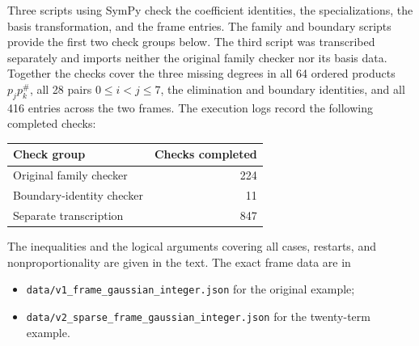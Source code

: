 Three scripts using SymPy check the coefficient identities, the
specializations, the basis transformation, and the frame entries.
The family and boundary scripts provide the first two check groups below.
The third script was transcribed separately and imports neither the original
family checker nor its basis data. Together the checks cover the three missing
degrees in all 64 ordered products $p_jp_k^\#$, all 28 pairs $0\le i<j\le7$,
the elimination and boundary identities, and all 416 entries across the
two frames. The execution logs record the following completed checks:
\begin{center}
\begin{tabular}{lr}
\toprule
Check group & Checks completed\\
\midrule
Original family checker &224\\
Boundary-identity checker &11\\
Separate transcription &847\\
\bottomrule
\end{tabular}
\end{center}
The inequalities and the logical arguments covering all cases, restarts,
and nonproportionality are given in the text. The exact frame data are in
\begin{itemize}
\item \texttt{data/v1\_frame\_gaussian\_integer.json} for the original example;
\item \texttt{data/v2\_sparse\_frame\_gaussian\_integer.json} for the twenty-term example.
\end{itemize}
